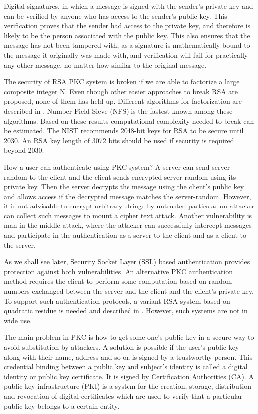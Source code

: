 \begin{multicols}{2}
Digital signatures, in which a message is signed with the sender's private key and can be verified by anyone who has access to the sender's public key. This verification proves that the sender had access to the private key, and therefore is likely to be the person associated with the public key. This also ensures that the message has not been tampered with, as a signature is mathematically bound to the message it originally was made with, and verification will fail for practically any other message, no matter how similar to the original message.

The security of RSA PKC system is broken if we are able to factorize a large composite integer N. Even though other easier approaches to break RSA are proposed, none of them has held up. Different algorithms for factorization are described in \cite{chap2-key1}. Number Field Sieve (NFS) is the fastest known among these algorithms. Based on these results computational complexity needed to break can be estimated. The NIST recommends 2048-bit keys for RSA to be secure until 2030. An RSA key length of 3072 bits should be used if security is required beyond 2030. 

How a user can authenticate using PKC system? A server can send server-random to the client and the client sends encrypted server-random using its private key. Then the server decrypts the message using the client's public key and allows access if the decrypted message matches the server-random. However, it is not advisable to encrypt arbitrary strings by untrusted parties as an attacker can collect such messages to mount a cipher text attack. Another vulnerability is man-in-the-middle attack, where the attacker can successfully intercept messages and participate in the authentication as a server to the client and as a client to the server.

As we shall see later, Security Socket Layer (SSL) based authentication provides protection against both vulnerabilities. An alternative PKC authentication method requires the client to perform some computation based on random numbers exchanged between the server and the client and the client's private key. To support such authentication protocols, a variant RSA system based on quadratic residue is needed and described in \cite{chap2-key1}. However, such systems are not in wide use. 

The main problem in PKC is how to get some one's public key in a secure way to avoid substitution by attackers. A solution is possible if the user's public key along with their name, address and so on is signed by a trustworthy person. This credential binding between a public key and subject's identity is called a digital identity or public key certificate. It is signed by Certification Authorities (CA). A public key infrastructure (PKI) is a system for the creation, storage, distribution and revocation of digital certificates which are used to verify that a particular public key belongs to a certain entity. 


\end{multicols}
